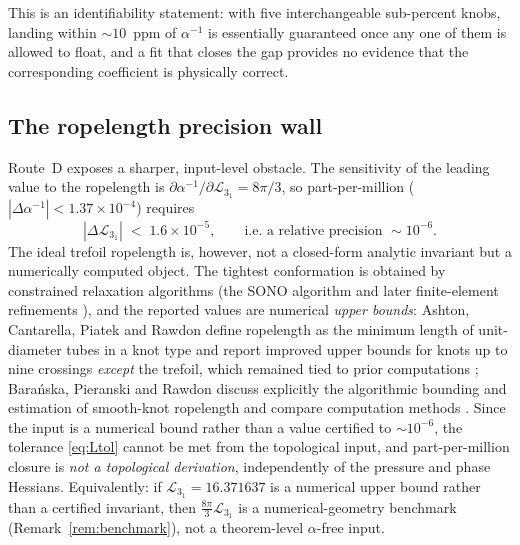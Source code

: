 \documentclass[11pt,a4paper]{article}
\theoremstyle{definition}
\begin{document}
\noindent This is an identifiability statement: with five interchangeable
sub-percent knobs, landing within $\sim10$~ppm of $\alpha^{-1}$ is essentially
guaranteed once any one of them is allowed to float, and a fit that closes the gap
provides no evidence that the corresponding coefficient is physically correct.

\subsection*{The ropelength precision wall}
Route~D exposes a sharper, input-level obstacle. The sensitivity of the leading
value to the ropelength is $\partial\alpha^{-1}/\partial\mathcal{L}_{3_1}=8\pi/3$,
so part-per-million ($|\Delta\alpha^{-1}|<1.37\times10^{-4}$) requires
\begin{equation}
  |\Delta\mathcal{L}_{3_1}| \;<\; 1.6\times10^{-5},
  \qquad\text{i.e. a relative precision } \sim10^{-6}.
  \label{eq:Ltol}
\end{equation}
The ideal trefoil ropelength is, however, not a closed-form analytic invariant but
a numerically computed object. The tightest conformation is obtained by
constrained relaxation algorithms (the SONO algorithm
\cite{PieranskiPrzybyl2001IdealTrefoil} and later finite-element refinements
\cite{PrzybylPieranski2014HighResolutionTrefoil}), and the reported values are
numerical \emph{upper bounds}: Ashton, Cantarella, Piatek and Rawdon define
ropelength as the minimum length of unit-diameter tubes in a knot type and report
improved upper bounds for knots up to nine crossings \emph{except} the trefoil,
which remained tied to prior computations
\cite{AshtonCantarellaPiatekRawdon2005SelfContact}; Bara\'nska, Pieranski and
Rawdon discuss explicitly the algorithmic bounding and estimation of smooth-knot
ropelength and compare computation methods
\cite{BaranskaPieranskiRawdon2004RopelengthPolygonal}. Since the input is a
numerical bound rather than a value certified to $\sim10^{-6}$, the tolerance
\eqref{eq:Ltol} cannot be met from the topological input, and part-per-million
closure is \emph{not a topological derivation}, independently of the pressure and
phase Hessians. Equivalently: if $\mathcal{L}_{3_1}=16.371637$ is a numerical
upper bound rather than a certified invariant, then $\tfrac{8\pi}{3}\mathcal{L}_{3_1}$
is a numerical-geometry benchmark (Remark~\ref{rem:benchmark}), not a theorem-level
$\alpha$-free input.
\end{document}
